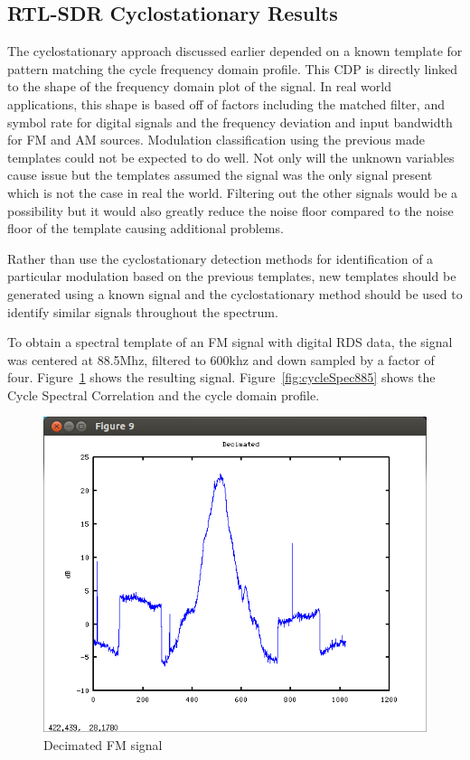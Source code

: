 \subsection*{RTL-SDR Cyclostationary Results}

The cyclostationary approach discussed earlier depended
on a known template for pattern matching the cycle frequency domain profile. 
This CDP is directly linked to the shape of the frequency domain plot of the
signal.  In real world applications, this shape is based off of factors
including the matched filter, and symbol rate for digital signals and the
frequency deviation and input bandwidth for FM and AM sources.
Modulation classification using the previous made templates could not be
expected to do well.  Not only will the unknown variables cause issue but the templates
assumed the signal was the only signal present which is not the case in real the
world.  Filtering out the other signals would be a possibility but it would also
greatly reduce the noise floor compared to the noise floor of the template
causing additional problems.

Rather than use the cyclostationary detection methods for identification of a
particular modulation based on the previous templates, new templates should be
generated using a known signal and the cyclostationary method should be used to
identify similar signals throughout the spectrum.  

To obtain a spectral template of an FM signal with digital RDS data, the signal
was centered at 88.5Mhz, filtered to 600khz and down sampled by a factor of four.
Figure~\ref{fig:decimatedFMandDig} shows the resulting signal. 
Figure~\ref{fig:cycleSpec885} shows the Cycle Spectral Correlation and the cycle
domain profile.

\begin{figure}
\centering
\includegraphics[width=\linewidth]{../img/Report_Decimated_FM_and_Digital.png}
\caption{Decimated FM signal}
\label{fig:decimatedFMandDig}

\end{figure}

